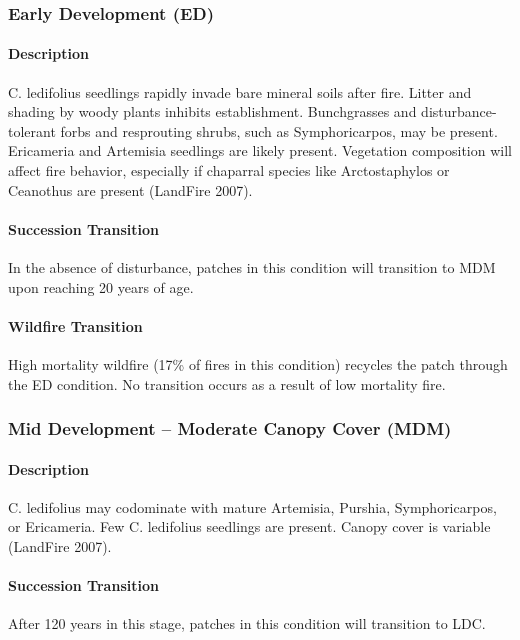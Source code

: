 \subsubsection{Early Development (ED)}

\paragraph{Description} C. ledifolius seedlings rapidly invade bare mineral soils after fire. Litter and shading by woody plants inhibits establishment. Bunchgrasses and disturbance-tolerant forbs and resprouting shrubs, such as Symphoricarpos, may be present. Ericameria and Artemisia seedlings are likely present. Vegetation composition will affect fire behavior, especially if chaparral species like Arctostaphylos or Ceanothus are present (LandFire 2007).

\paragraph{Succession Transition} In the absence of disturbance, patches in this condition will transition to MDM upon reaching 20 years of age. 

\paragraph{Wildfire Transition} High mortality wildfire (17\% of fires in this condition) recycles the patch through the ED condition. No transition occurs as a result of low mortality fire.

\hrulefill


\subsubsection{Mid Development – Moderate Canopy Cover (MDM)}

\paragraph{Description} C. ledifolius may codominate with mature Artemisia, Purshia, Symphoricarpos, or Ericameria. Few C. ledifolius seedlings are present. Canopy cover is variable (LandFire 2007).

\paragraph{Succession Transition} After 120 years in this stage, patches in this condition will transition to LDC.

